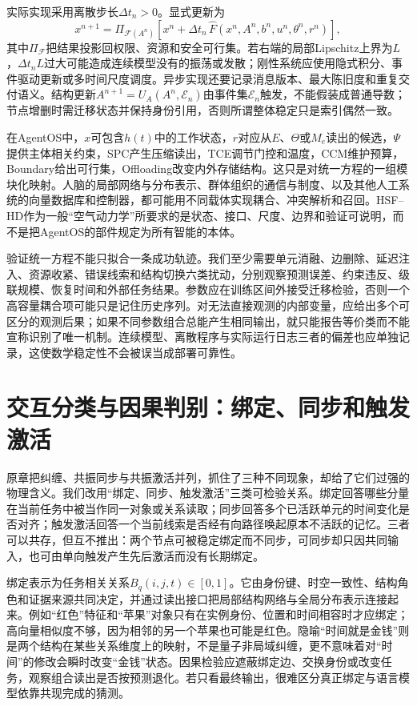 实际实现采用离散步长$\Delta t_n>0$。显式更新为
\begin{equation}
x^{n+1}=\Pi_{\mathcal F(A^n)}\!\left[x^n+\Delta t_n\,\widehat F(x^n,A^n,b^n,u^n,\theta^n,r^n)\right],
\end{equation}
其中$\Pi_{\mathcal F}$把结果投影回权限、资源和安全可行集。若右端的局部Lipschitz上界为$L$，$\Delta t_nL$过大可能造成连续模型没有的振荡或发散；刚性系统应使用隐式积分、事件驱动更新或多时间尺度调度。异步实现还要记录消息版本、最大陈旧度和重复交付语义。结构更新$A^{n+1}=U_A(A^n,\mathcal E_n)$由事件集$\mathcal E_n$触发，不能假装成普通导数；节点增删时需迁移状态并保持身份引用，否则所谓整体稳定只是索引偶然一致。

在AgentOS中，$x$可包含$h(t)$中的工作状态，$r$对应从$E$、$\Theta$或$M_e$读出的候选，$\Psi$提供主体相关约束，SPC产生压缩读出，TCE调节门控和温度，CCM维护预算，Boundary给出可行集，Offloading改变内外存储结构。这只是对统一方程的一组模块化映射。人脑的局部网络与分布表示、群体组织的通信与制度、以及其他人工系统的向量数据库和控制器，都可能用不同载体实现耦合、冲突解析和召回。HSF--HD作为一般“空气动力学”所要求的是状态、接口、尺度、边界和验证可说明，而不是把AgentOS的部件规定为所有智能的本体。

验证统一方程不能只拟合一条成功轨迹。我们至少需要单元消融、边删除、延迟注入、资源收紧、错误线索和结构切换六类扰动，分别观察预测误差、约束违反、级联规模、恢复时间和外部任务结果。参数应在训练区间外接受迁移检验，否则一个高容量耦合项可能只是记住历史序列。对无法直接观测的内部变量，应给出多个可区分的观测后果；如果不同参数组合总能产生相同输出，就只能报告等价类而不能宣称识别了唯一机制。连续模型、离散程序与实际运行日志三者的偏差也应单独记录，这使数学稳定性不会被误当成部署可靠性。

\section{交互分类与因果判别：绑定、同步和触发激活}
\label{sec:geometric_taxonomy_of_many_body_interactions}

原章把纠缠、共振同步与共振激活并列，抓住了三种不同现象，却给了它们过强的物理含义。我们改用“绑定、同步、触发激活”三类可检验关系。绑定回答哪些分量在当前任务中被当作同一对象或关系读取；同步回答多个已活跃单元的时间变化是否对齐；触发激活回答一个当前线索是否经有向路径唤起原本不活跃的记忆。三者可以共存，但互不推出：两个节点可被稳定绑定而不同步，可同步却只因共同输入，也可由单向触发产生先后激活而没有长期绑定。

绑定表示为任务相关关系$B_q(i,j,t)\in[0,1]$。它由身份键、时空一致性、结构角色和证据来源共同决定，并通过读出接口把局部结构网络与全局分布表示连接起来。例如“红色”特征和“苹果”对象只有在实例身份、位置和时间相容时才应绑定；高向量相似度不够，因为相邻的另一个苹果也可能是红色。隐喻“时间就是金钱”则是两个结构在某些关系维度上的映射，不是量子非局域纠缠，更不意味着对“时间”的修改会瞬时改变“金钱”状态。因果检验应遮蔽绑定边、交换身份或改变任务，观察组合读出是否按预测退化。若只看最终输出，很难区分真正绑定与语言模型依靠共现完成的猜测。

